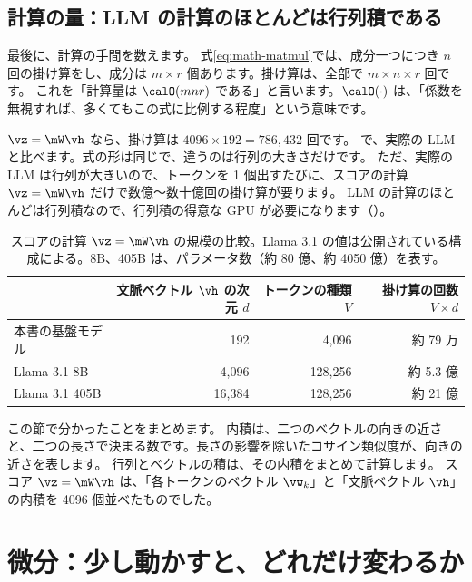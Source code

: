 \subsection*{計算の量：LLM の計算のほとんどは行列積である}

最後に、計算の手間を数えます。
式\eqref{eq:math-matmul}では、成分一つにつき $n$ 回の掛け算をし、成分は $m\times r$ 個あります。掛け算は、全部で $m\times n\times r$ 回です。
これを「計算量は $\calO(mnr)$ である」と言います。$\calO(\cdot)$ は、「係数を無視すれば、多くてもこの式に比例する程度」という意味です。

$\vz=\mW\vh$ なら、掛け算は $4096\times 192=786{,}432$ 回です。
で、実際の LLM と比べます。式の形は同じで、違うのは行列の大きさだけです。
ただ、実際の LLM は行列が大きいので、トークンを 1 個出すたびに、スコアの計算 $\vz=\mW\vh$ だけで数億〜数十億回の掛け算が要ります。
LLM の計算のほとんどは行列積なので、行列積の得意な GPU が必要になります（）。

\begin{table}[tbp]
\centering
\caption{スコアの計算 $\vz=\mW\vh$ の規模の比較。Llama 3.1 の値は公開されている構成による\cite{dubey2024llama3}。8B、405B は、パラメータ数（約 80 億、約 4050 億）を表す。}
\label{tab:math-scale}
\small
\begin{tabular}{@{}lrrr@{}}
\toprule
 & 文脈ベクトル $\vh$ の次元 $d$ & トークンの種類 $V$ & 掛け算の回数 $V\times d$ \\
\midrule
本書の基盤モデル & 192 & 4,096 & 約 79 万 \\
Llama 3.1 8B & 4,096 & 128,256 & 約 5.3 億 \\
Llama 3.1 405B & 16,384 & 128,256 & 約 21 億 \\
\bottomrule
\end{tabular}
\end{table}

この節で分かったことをまとめます。
内積は、二つのベクトルの向きの近さと、二つの長さで決まる数です。長さの影響を除いたコサイン類似度が、向きの近さを表します。
行列とベクトルの積は、その内積をまとめて計算します。
スコア $\vz=\mW\vh$ は、「各トークンのベクトル $\vw_k$」と「文脈ベクトル $\vh$」の内積を 4096 個並べたものでした。

\section{微分：少し動かすと、どれだけ変わるか}\label{sec:math-calculus}

